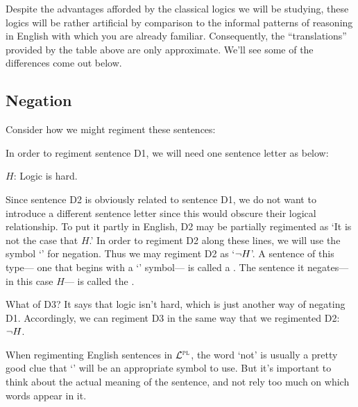 Despite the advantages afforded by the classical logics we will be studying, these logics will be rather artificial by comparison to the informal patterns of reasoning in English with which you are already familiar.
Consequently, the ``translations'' provided by the table above are only approximate.
We'll see some of the differences come out below.





\subsection{Negation}
  \label{sub.negation}

Consider how we might regiment these sentences:

\begin{earg}
\end{earg}

In order to regiment sentence D1, we will need one sentence letter as below:

\begin{ekey}
  \item[$H$:] Logic is hard.
\end{ekey}

Since sentence D2 is obviously related to sentence D1, we do not want to introduce a different sentence letter since this would obscure their logical relationship.
To put it partly in English, D2 may be partially regimented as `It is not the case that $H$.'
In order to regiment D2 along these lines, we will use the symbol `\enot' for negation.
Thus we may regiment D2 as `$\neg H$'.
A sentence of this type--- one that begins with a `\enot' symbol--- is called a .
The sentence it negates--- in this case $H$--- is called the .

What of D3?
It says that logic isn't hard, which is just another way of negating D1.
Accordingly, we can regiment D3 in the same way that we regimented D2: $\neg H$.

When regimenting English sentences in $\mathcal{L}^{\textsc{pl}}$, the word `not' is usually a pretty good clue that `\enot' will be an appropriate symbol to use.
But it's important to think about the actual meaning of the sentence, and not rely too much on which words appear in it.


